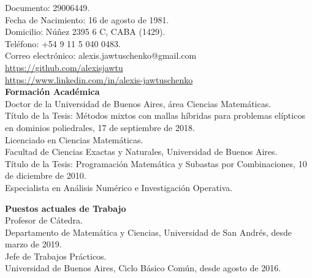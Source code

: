 \documentclass{res} %
\begin{document}
\begin{resume}
\bigskip
Documento: 29006449.\\
Fecha de Nacimiento: 16 de agosto de 1981.\\
Domicilio: N\'u\~nez 2395 6 C, CABA (1429).\\
Tel\'efono: +54 9 11 5 040 0483.\\
Correo electr\'onico: alexis.jawtuschenko@gmail.com\\%
\href{https://github.com/alexisjawtu}{{\color{blue}https://github.com/alexisjawtu}}\\
\href{https://www.linkedin.com/in/alexis-jawtuschenko-486b4139/}{{\color{blue}https://www.linkedin.com/in/alexis-jawtuschenko}}
\\[5pt]

\textbf{Formaci\'on Acad\'emica}\\[6pt]
Doctor de la Universidad de Buenos Aires, \'area Ciencias Matem\'aticas.\\
T\'itulo de la Tesis: M\'etodos mixtos con mallas h\'ibridas para problemas el\'ipticos
en dominios poliedrales, 17 de septiembre de 2018.\\[4pt]
Licenciado en Ciencias Matem\'aticas.\\
Facultad de Ciencias Exactas y Naturales, Universidad de Buenos Aires.\\
T\'itulo de la Tesis: Programaci\'on Matem\'atica y Subastas por Combinaciones, 10 de diciembre de 2010.\\[4pt]
Especialista en An\'alisis Num\'erico e Investigaci\'on Operativa.

\textbf{Puestos actuales de Trabajo}\\[6pt]
Profesor de C\'atedra.\\    
Departamento de Matem\'atica y Ciencias, 
Universidad de San Andr\'es, desde marzo de 2019.\\[4pt]
Jefe de Trabajos Pr\'acticos.\\Universidad de Buenos Aires, Ciclo B\'asico Com\'un, desde agosto de 2016.
    


\end{resume}
\end{document}
